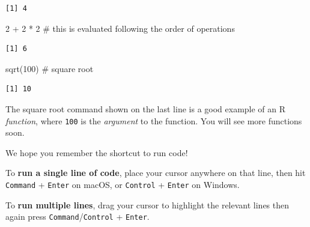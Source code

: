 \documentclass[
  letterpaper,
  DIV=11,
  numbers=noendperiod]{scrreprt}
\newenvironment{Shaded}{\begin{snugshade}}{\end{snugshade}}
\newcommand{\CommentTok}[1]{\textcolor[rgb]{0.37,0.37,0.37}{#1}}
\newcommand{\DecValTok}[1]{\textcolor[rgb]{0.68,0.00,0.00}{#1}}
\newcommand{\FunctionTok}[1]{\textcolor[rgb]{0.28,0.35,0.67}{#1}}
\newcommand{\NormalTok}[1]{\textcolor[rgb]{0.00,0.23,0.31}{#1}}
\newcommand{\SpecialCharTok}[1]{\textcolor[rgb]{0.37,0.37,0.37}{#1}}
\begin{document}
\begin{verbatim}
[1] 4
\end{verbatim}

\begin{Shaded}
\begin{Highlighting}[]
\DecValTok{2} \SpecialCharTok{+} \DecValTok{2} \SpecialCharTok{*} \DecValTok{2}   \CommentTok{\# this is evaluated following the order of operations}
\end{Highlighting}
\end{Shaded}

\begin{verbatim}
[1] 6
\end{verbatim}

\begin{Shaded}
\begin{Highlighting}[]
\FunctionTok{sqrt}\NormalTok{(}\DecValTok{100}\NormalTok{)   }\CommentTok{\# square root}
\end{Highlighting}
\end{Shaded}

\begin{verbatim}
[1] 10
\end{verbatim}

The square root command shown on the last line is a good example of an R
\emph{function}, where \texttt{100} is the \emph{argument} to the
function. You will see more functions soon.

\begin{tcolorbox}[enhanced jigsaw, titlerule=0mm, colback=white, left=2mm, breakable, opacitybacktitle=0.6, colbacktitle=quarto-callout-note-color!10!white, colframe=quarto-callout-note-color-frame, bottomtitle=1mm, opacityback=0, coltitle=black, arc=.35mm, toptitle=1mm, title=\textcolor{quarto-callout-note-color}{\faInfo}\hspace{0.5em}{Reminder}, leftrule=.75mm, toprule=.15mm, bottomrule=.15mm, rightrule=.15mm]

We hope you remember the shortcut to run code!

To \textbf{run a single line of code}, place your cursor anywhere on
that line, then hit \texttt{Command} + \texttt{Enter} on macOS, or
\texttt{Control} + \texttt{Enter} on Windows.

To \textbf{run multiple lines}, drag your cursor to highlight the
relevant lines then again press \texttt{Command}/\texttt{Control} +
\texttt{Enter}.

\end{tcolorbox}
\end{document}
